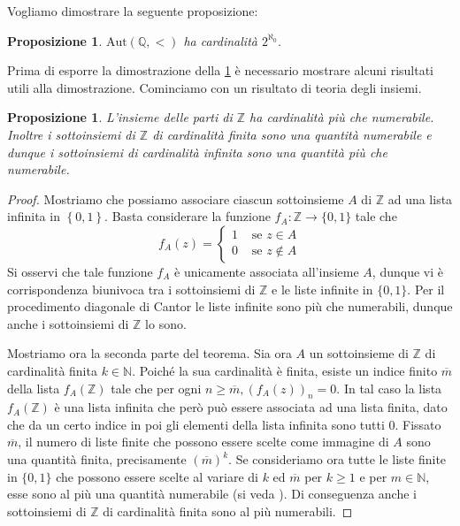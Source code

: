 \documentclass[12pt,a4paper,openright]{report}
\newcommand{\aut}{ \mathrm{Aut} ( \mathbb{Q},< ) } %
\newcommand{\N}{\mathbb{N}} %
\newcommand{\Z}{\mathbb{Z}} %
\newcommand{\0}{\setminus\{0\}} %
\theoremstyle{definition}
\theoremstyle{plain}
\newtheorem{prop}[defn]{Proposizione}
\begin{document}
Vogliamo dimostrare la seguente proposizione:
\begin{prop}\label{prop:card_aut}
    $\aut$ ha cardinalità $2^{\aleph_0}$.
\end{prop}
Prima di esporre la dimostrazione della \cref{prop:card_aut} è necessario mostrare alcuni risultati utili alla dimostrazione.
Cominciamo con un risultato di teoria degli insiemi.
\begin{prop} \label{prop:card_ins_Z}
    L'insieme delle parti di $\Z$ ha cardinalità più che numerabile. Inoltre i sottoinsiemi di $\Z$ di cardinalità finita sono una quantità numerabile e dunque i sottoinsiemi di cardinalità infinita sono una quantità più che numerabile.
\end{prop}
\begin{proof}
Mostriamo che possiamo associare ciascun sottoinsieme $A$ di $\Z$ ad una lista infinita in $\left\lbrace0,1\right\rbrace$. Basta considerare la funzione $f_A:\Z\rightarrow \{0,1\}$ tale che \[f_A(z)= \begin{cases}1 & \mbox{ se } z \in A \\ 0 & \mbox{ se } z \notin A  \end{cases}\]
Si osservi che tale funzione $f_A$ è unicamente associata all'insieme $A$, dunque vi è corrispondenza biunivoca tra i sottoinsiemi di $\Z$ e le liste infinite in $\{0,1\}$. Per il procedimento diagonale di Cantor le liste infinite sono più che numerabili, dunque anche i sottoinsiemi di $\Z$ lo sono.

Mostriamo ora la seconda parte del teorema. Sia ora $A$ un sottoinsieme di $\Z$ di cardinalità finita $k \in \N$. Poiché la sua cardinalità è finita, esiste un indice finito $\overline{m}$ della lista $f_A(\Z)$ tale che per ogni $n \geq \overline{m}, \left(f_A(z)\right)_n=0$. In tal caso la lista $f_A(\Z)$ è una lista infinita che però può essere associata ad una lista finita, dato che da un certo indice in poi gli elementi della lista infinita sono tutti $0$. Fissato $\overline{m}$, il numero di liste finite che possono essere scelte come immagine di $A$ sono una quantità finita, precisamente $\left(\overline{m}\right)^k$. Se consideriamo ora tutte le liste finite in $\{0,1\}$ che possono essere scelte al variare di $k$ ed $\overline{m}$ per $k \geq 1$ e per $m \in \N$, esse sono al più una quantità numerabile (si veda \cite[Introduction, Theorem 8.12]{hunger}).  Di conseguenza anche i sottoinsiemi di $\Z$ di cardinalità finita sono al più numerabili.
\end{proof}
\end{document}
